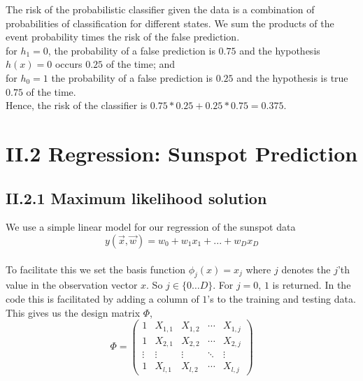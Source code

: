 \documentclass{article}
\theoremstyle{dotless}
\newcounter{min}
\newcommand{\Section}[1]{\section{#1}
\setcounter{min}{1}}
\begin{document}
The risk of the probabilistic classifier given the data is a combination of probabilities of classification for different states. We sum the products of the event probability times the risk of the false prediction.\\

for $h_1 = 0$, the probability of a false prediction is $0.75$ and the hypothesis $h(x) =0$ occurs $0.25$ of the time; and\\
for $h_0 =1$ the probability of a false prediction is $0.25$ and the hypothesis is true $0.75$ of the time.\\

Hence, the risk of the classifier is $0.75*0.25 + 0.25 * 0.75 = 0.375$.\\

\Section{II.2 Regression: Sunspot Prediction}

\subsection{II.2.1 Maximum likelihood solution}

We use a simple linear model for our regression of the sunspot data\\

\begin{equation} \label{simplelinear}
y(\vec{x},\vec{w}) = w_0 + w_1x_1 + ... + w_Dx_D
\end{equation}\\

To facilitate this we set the basis function $\phi_j(x) = x_j$ where \emph{$j$} denotes the $j$'th value in the observation vector $x$. So $j \in \{0 \dots D\}$. For $j = 0$, $1$ is returned. In the code this is facilitated by adding a column of $1$'s to the training and testing data.\\

This gives us the design matrix $\Phi$,\\

\begin{equation} \label{Phi}
\Phi = 
 \begin{pmatrix}
  1 & X_{1,1} & X_{1,2} & \cdots & X_{1,j} \\
  1 & X_{2,1} & X_{2,2} & \cdots & X_{2,j} \\
  \vdots & \vdots  & \vdots  & \ddots & \vdots  \\
  1 & X_{l,1} & X_{l,2} & \cdots & X_{l,j}
 \end{pmatrix}
 \end{equation}\\
\end{document}
